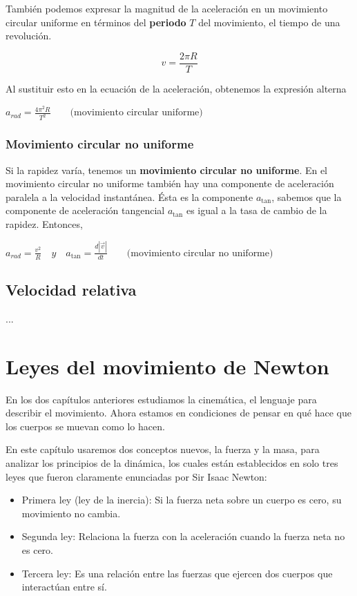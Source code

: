 \documentclass{article}
\newcommand{\newsection}[1]{
    \pagebreak
    {\color{sectionColor}
    \centering
    \section{\bl{#1}}}
    \color{black}
    \vspace{0.5cm}
}
\newcommand{\newsubsection}[1]{
    \vspace{0.5cm}
    \color{sectionColor}
    \subsection{\bl{#1}}
    \color{black}
    \vspace{0.5cm}
}
\newcommand{\newtitle}[1]{
    \color{titleColor}
    \subsubsection{#1}
    \color{black}
}
\newcommand{\bl}[1]{\textbf{#1}}
\newcommand{\definicion}[1]{%
    \vspace{0.5cm}
    \begin{definicionbox}
        #1
    \end{definicionbox}
    \vspace{0.5cm}
}
\begin{document}
    \vspace{0.5cm}

    \par También podemos expresar la magnitud de la aceleración en un movimiento circular uniforme en términos del \bl{periodo} $T$ del movimiento, el tiempo de una revolución.

    \[ v = \frac{2 \pi R}{T} \]

    \par Al sustituir esto en la ecuación de la aceleración, obtenemos la expresión alterna

    \definicion{
        \centering
        \( a_{rad} = \frac{4 \pi^2 R}{T^2} \quad \quad \text{(movimiento circular uniforme)} \)
    }

    \newtitle{Movimiento circular no uniforme}

    \par Si la rapidez varía, tenemos un \bl{movimiento circular no uniforme}. En el movimiento circular no uniforme también hay una componente de aceleración paralela a la velocidad instantánea. Ésta es la componente $a_{\tan}$, sabemos que la componente de aceleración tangencial $a_{\tan}$ es igual a la tasa de cambio de la rapidez. Entonces,
    
    \definicion{
        \centering
        \( a_{rad} = \frac{v^2}{R} \quad y \quad a_{\tan} = \frac{d\left\lvert \vec{v}\right\rvert }{dt} \quad \quad \text{(movimiento circular no uniforme)} \)
    }

    \newsubsection{Velocidad relativa}

    \par ... %


\newsection{Leyes del movimiento de Newton}

\par En los dos capítulos anteriores estudiamos la cinemática, el lenguaje para describir el movimiento. Ahora estamos en condiciones de pensar en qué hace que los cuerpos se muevan como lo hacen.

\par En este capítulo usaremos dos conceptos nuevos, la fuerza y la masa, para analizar los principios de la dinámica, los cuales están establecidos en solo tres leyes que fueron claramente enunciadas por Sir Isaac Newton:

\begin{itemize}
    \item Primera ley (ley de la inercia): Si la fuerza neta sobre un cuerpo es cero, su movimiento no cambia.
    \item Segunda ley: Relaciona la fuerza con la aceleración cuando la fuerza neta no es cero.
    \item Tercera ley: Es una relación entre las fuerzas que ejercen dos cuerpos que interactúan entre sí.
\end{itemize}
\end{document}
